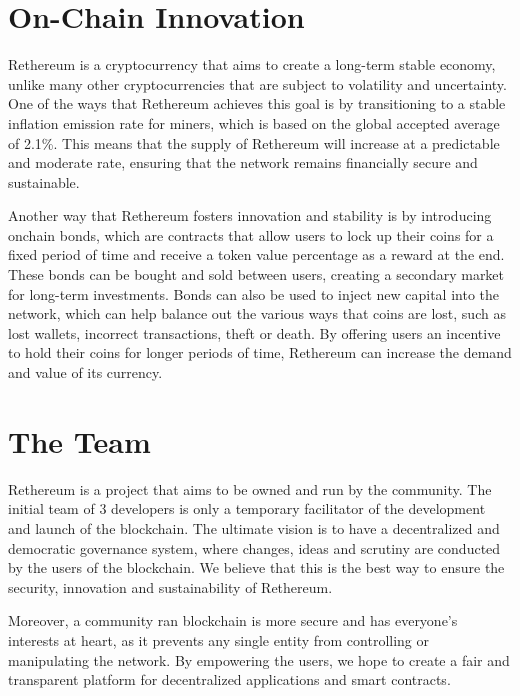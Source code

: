 \documentclass[a4paper,onecolumn, superscriptaddress,10pt,accepted=2020-05-01,issue=1, volume=2, shorttitle=papers]{compositionalityarticle}
\begin{document}
\section{On-Chain Innovation}

Rethereum is a cryptocurrency that aims to create a long-term stable economy, unlike many other cryptocurrencies that are subject to volatility and uncertainty. One of the ways that Rethereum achieves this goal is by transitioning to a stable inflation emission rate for miners, which is based on the global accepted average of 2.1\%. This means that the supply of Rethereum will increase at a predictable and moderate rate, ensuring that the network remains financially secure and sustainable.

\vspace{0.3cm}

Another way that Rethereum fosters innovation and stability is by introducing onchain bonds, which are contracts that allow users to lock up their coins for a fixed period of time and receive a token value percentage as a reward at the end. These bonds can be bought and sold between users, creating a secondary market for long-term investments. Bonds can also be used to inject new capital into the network, which can help balance out the various ways that coins are lost, such as lost wallets, incorrect transactions, theft or death. By offering users an incentive to hold their coins for longer periods of time, Rethereum can increase the demand and value of its currency.


\section{The Team}

Rethereum is a project that aims to be owned and run by the community. The initial team of 3 developers is only a temporary facilitator of the development and launch of the blockchain. The ultimate vision is to have a decentralized and democratic governance system, where changes, ideas and scrutiny are conducted by the users of the blockchain. We believe that this is the best way to ensure the security, innovation and sustainability of Rethereum.

\vspace{0.3cm}

Moreover, a community ran blockchain is more secure and has everyone's interests at heart, as it prevents any single entity from controlling or manipulating the network. By empowering the users, we hope to create a fair and transparent platform for decentralized applications and smart contracts.
\end{document}
